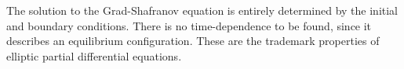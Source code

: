 \documentclass[%
 reprint,
 amsmath,amssymb,
 aps,
]{revtex4-2}
\begin{document}
The solution to the Grad-Shafranov equation is entirely determined by the initial and boundary conditions. There is no time-dependence to be found, since it describes an equilibrium configuration. These are the trademark properties of elliptic partial differential equations.


\nocite{*}

\end{document}
